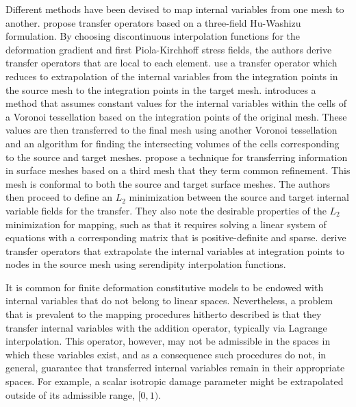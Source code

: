 \documentclass[12pt]{article}
\begin{document}
Different methods have been devised to map internal variables from one mesh to
another. \citet{Ortiz.Quigley:1991} propose transfer operators based on a
three-field Hu-Washizu formulation. By choosing discontinuous interpolation
functions for the deformation gradient and first Piola-Kirchhoff stress fields,
the authors derive transfer operators that are local to each element.
\citet{Radovitzky.Ortiz:1999} use a transfer operator which reduces to
extrapolation of the internal variables from the integration points in the
source mesh to the integration points in the target mesh.  \citet{Rashid:2002}
introduces a method that assumes constant values for the internal variables
within the cells of a Voronoi tessellation based on the integration points of
the original mesh. These values are then transferred to the final mesh using
another Voronoi tessellation and an algorithm for finding the intersecting
volumes of the cells corresponding to the source and target meshes.
\citet{Jiao.Heath:2004} propose a technique for transferring information in
surface meshes based on a third mesh that they term common refinement. This mesh
is conformal to both the source and target surface meshes. The authors then
proceed to define an $L_2$ minimization between the source and target internal
variable fields for the transfer. They also note the desirable properties of the
$L_2$ minimization for mapping, such as that it requires solving a linear system
of equations with a corresponding matrix that is positive-definite and sparse.
\citet{Bucher.etal:2007} derive transfer operators that extrapolate the internal
variables at integration points to nodes in the source mesh using serendipity
interpolation functions.

It is common for finite deformation constitutive models to be endowed with
internal variables that do not belong to linear spaces. Nevertheless, a problem
that is prevalent to the mapping procedures hitherto described is that they
transfer internal variables with the addition operator, typically via Lagrange
interpolation. This operator, however, may not be admissible in the spaces in
which these variables exist, and as a consequence such procedures do not, in
general, guarantee that transferred internal variables remain in their
appropriate spaces. For example, a scalar isotropic damage parameter might be
extrapolated outside of its admissible range, $[0,1)$.
\end{document}
